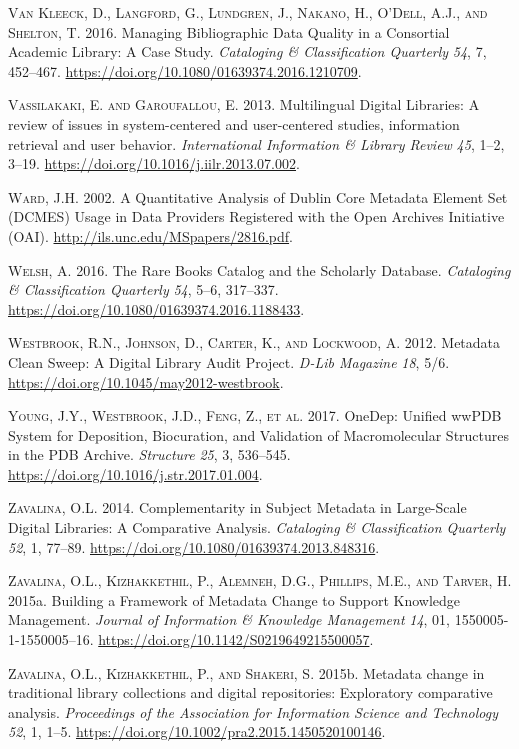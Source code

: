 \textsc{Van Kleeck, D., Langford, G., Lundgren, J., Nakano, H., O’Dell, A.J., and Shelton, T.} 2016. Managing Bibliographic Data Quality in a Consortial Academic Library: A Case Study. \emph{Cataloging \& Classification Quarterly} \emph{54}, 7, 452–467. \url{https://doi.org/10.1080/01639374.2016.1210709}.

\textsc{Vassilakaki, E. and Garoufallou, E.} 2013. Multilingual Digital Libraries: A review of issues in system-centered and user-centered studies, information retrieval and user behavior. \emph{International Information \& Library Review} \emph{45}, 1–2, 3–19. \url{https://doi.org/10.1016/j.iilr.2013.07.002}.

\textsc{Ward, J.H.} 2002. A Quantitative Analysis of Dublin Core Metadata Element Set (DCMES) Usage in Data Providers Registered with the Open Archives Initiative (OAI). \url{http://ils.unc.edu/MSpapers/2816.pdf}.

\textsc{Welsh, A.} 2016. The Rare Books Catalog and the Scholarly Database. \emph{Cataloging \& Classification Quarterly} \emph{54}, 5–6, 317–337. \url{https://doi.org/10.1080/01639374.2016.1188433}.

\textsc{Westbrook, R.N., Johnson, D., Carter, K., and Lockwood, A.} 2012. Metadata Clean Sweep: A Digital Library Audit Project. \emph{D-Lib Magazine} \emph{18}, 5/6. \url{https://doi.org/10.1045/may2012-westbrook}.

\textsc{Young, J.Y., Westbrook, J.D., Feng, Z., et al.} 2017. OneDep: Unified wwPDB System for Deposition, Biocuration, and Validation of Macromolecular Structures in the PDB Archive. \emph{Structure} \emph{25}, 3, 536–545. \url{https://doi.org/10.1016/j.str.2017.01.004}.

\textsc{Zavalina, O.L.} 2014. Complementarity in Subject Metadata in Large-Scale Digital Libraries: A Comparative Analysis. \emph{Cataloging \& Classification Quarterly} \emph{52}, 1, 77–89. \url{https://doi.org/10.1080/01639374.2013.848316}.

\textsc{Zavalina, O.L., Kizhakkethil, P., Alemneh, D.G., Phillips, M.E., and Tarver, H.} 2015a. Building a Framework of Metadata Change to Support Knowledge Management. \emph{Journal of Information \& Knowledge Management} \emph{14}, 01, 1550005-1-1550005–16. \url{https://doi.org/10.1142/S0219649215500057}.

\textsc{Zavalina, O.L., Kizhakkethil, P., and Shakeri, S.} 2015b. Metadata change in traditional library collections and digital repositories: Exploratory comparative analysis. \emph{Proceedings of the Association for Information Science and Technology} \emph{52}, 1, 1–5. \url{https://doi.org/10.1002/pra2.2015.1450520100146}.

